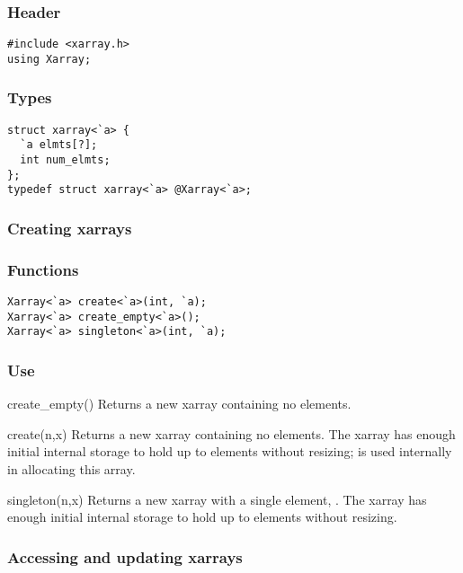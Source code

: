 \subsubsection*{Header}
\begin{verbatim}
#include <xarray.h>
using Xarray;
\end{verbatim}

\subsubsection*{Types}
\begin{verbatim}
struct xarray<`a> {
  `a elmts[?];
  int num_elmts;
};
typedef struct xarray<`a> @Xarray<`a>;
\end{verbatim}

\subsubsection*{Creating xarrays}
\subsubsection*{Functions}
\begin{verbatim}
Xarray<`a> create<`a>(int, `a);
Xarray<`a> create_empty<`a>();
Xarray<`a> singleton<`a>(int, `a);
\end{verbatim}

\subsubsection*{Use}

\begin{defun}{create_empty}{()}
Returns a new xarray containing no elements.
\end{defun}

\begin{defun}{create}{(n,x)}
Returns a new xarray containing no elements.  The xarray has enough
initial internal storage to hold up to  elements without
resizing;  is used internally in allocating this array.
\end{defun}

\begin{defun}{singleton}{(n,x)}
Returns a new xarray with a single element, .  The xarray has
enough initial internal storage to hold up to  elements without
resizing.
\end{defun}

\subsubsection*{Accessing and updating xarrays}
